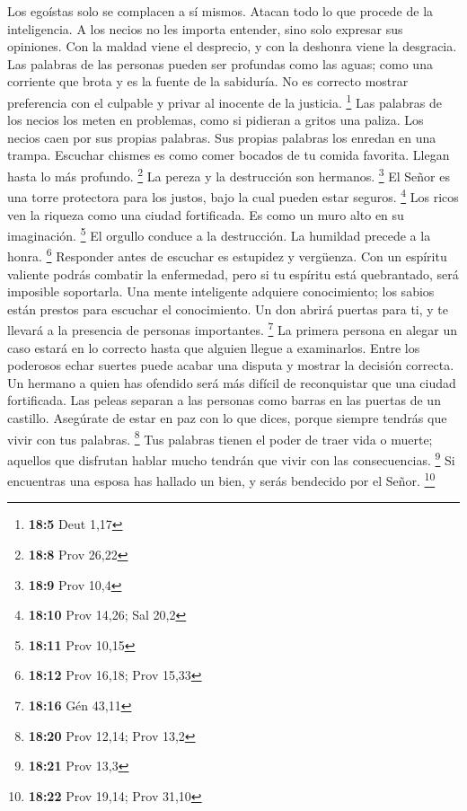  Los egoístas solo se complacen a sí mismos. Atacan todo lo
que procede de la inteligencia.  A los necios no les importa
entender, sino solo expresar sus opiniones.  Con la maldad
viene el desprecio, y con la deshonra viene la desgracia. 
Las palabras de las personas pueden ser profundas como las aguas; como
una corriente que brota y es la fuente de la sabiduría.  No
es correcto mostrar preferencia con el culpable y privar al inocente de
la justicia. \footnote{\textbf{18:5} Deut 1,17}  Las
palabras de los necios los meten en problemas, como si pidieran a gritos
una paliza.  Los necios caen por sus propias palabras. Sus
propias palabras los enredan en una trampa.  Escuchar
chismes es como comer bocados de tu comida favorita. Llegan hasta lo más
profundo. \footnote{\textbf{18:8} Prov 26,22}  La pereza y
la destrucción son hermanos. \footnote{\textbf{18:9} Prov 10,4}
 El Señor es una torre protectora para los justos, bajo la
cual pueden estar seguros. \footnote{\textbf{18:10} Prov 14,26; Sal 20,2}
 Los ricos ven la riqueza como una ciudad fortificada. Es
como un muro alto en su imaginación. \footnote{\textbf{18:11} Prov 10,15}
 El orgullo conduce a la destrucción. La humildad precede a
la honra. \footnote{\textbf{18:12} Prov 16,18; Prov 15,33} 
Responder antes de escuchar es estupidez y vergüenza.  Con
un espíritu valiente podrás combatir la enfermedad, pero si tu espíritu
está quebrantado, será imposible soportarla.  Una mente
inteligente adquiere conocimiento; los sabios están prestos para
escuchar el conocimiento.  Un don abrirá puertas para ti, y
te llevará a la presencia de personas importantes. \footnote{\textbf{18:16}
  Gén 43,11}  La primera persona en alegar un caso estará
en lo correcto hasta que alguien llegue a examinarlos. 
Entre los poderosos echar suertes puede acabar una disputa y mostrar la
decisión correcta.  Un hermano a quien has ofendido será
más difícil de reconquistar que una ciudad fortificada. Las peleas
separan a las personas como barras en las puertas de un castillo.
 Asegúrate de estar en paz con lo que dices, porque siempre
tendrás que vivir con tus palabras. \footnote{\textbf{18:20} Prov 12,14;
  Prov 13,2}  Tus palabras tienen el poder de traer vida o
muerte; aquellos que disfrutan hablar mucho tendrán que vivir con las
consecuencias. \footnote{\textbf{18:21} Prov 13,3}  Si
encuentras una esposa has hallado un bien, y serás bendecido por el
Señor. \footnote{\textbf{18:22} Prov 19,14; Prov 31,10}

